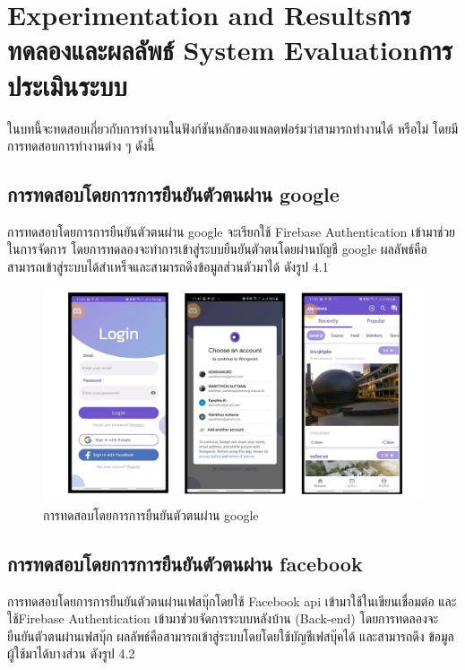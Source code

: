 \chapter{\ifproject%
\ifenglish Experimentation and Results\else การทดลองและผลลัพธ์\fi
\else%
\ifenglish System Evaluation\else การประเมินระบบ\fi
\fi}

\quad \quad ในบทนี้จะทดสอบเกี่ยวกับการทำงานในฟังก์ชันหลักของแพลตฟอร์มว่าสามารถทำงานได้
หรือไม่ โดยมีการทดสอบการทำงานต่าง ๆ ดังนี้

\section{การทดสอบโดยการการยืนยันตัวตนผ่าน google}
\quad \quad การทดสอบโดยการการยืนยันตัวตนผ่าน google จะเรียกใช้ Firebase Authentication เข้ามาช่วยในการจัดการ
โดยการทดลองจะทำการเข้าสู่ระบบยืนยันตัวตนโดยผ่านบัญชี google ผลลัพธ์คือสามารถเข้าสู่ระบบได้สำเหร็จและสามารถดึงข้อมูลส่วนตัวมาได้
ดังรูป 4.1 
    \begin{figure}
    \begin{center}
      \includegraphics[width=1\textwidth]{./image/testing/Slide1.JPG}
    \end{center}
    \caption[การทดสอบโดยการการยืนยันตัวตนผ่าน google]{การทดสอบโดยการการยืนยันตัวตนผ่าน google}
    \end{figure}

\section{การทดสอบโดยการการยืนยันตัวตนผ่าน facebook}
\quad \quad  การทดสอบโดยการการยืนยันตัวตนผ่านเฟสบุ๊กโดยใช้ Facebook api เข้ามาใช้ในเขียนเชื่อมต่อ และใช้Firebase Authentication 
เข้ามาช่วยจัดการระบบหลังบ้าน (Back-end) โดยการทดลองจะยืนยันตัวตนผ่านเฟสบุ๊ก ผลลัพธ์คือสามารถเข้าสู่ระบบโดยโดยใช้บัญชีเฟสบุ๊คได้ และสามารถดึง
ข้อมูลผู้ใช้มาได้บางส่วน ดังรูป 4.2

